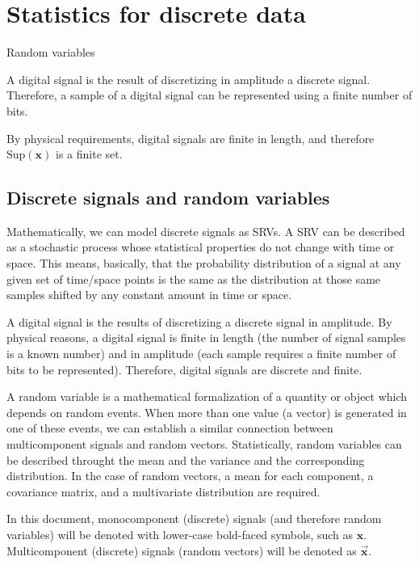 \chapter{Statistics for discrete data}

Random variables

A digital signal is the result of discretizing in amplitude a discrete
signal. Therefore, a sample of a digital signal can be represented
using a finite number of bits.

By physical requirements, digital signals are finite in length, and therefore
$\text{Sup}(\mathbf{x})$ is a finite set.

\section{Discrete signals and random variables}

Mathematically, we can model discrete signals as \glspl{SRV}. A
\gls{SRV} can be described as a stochastic process whose statistical
properties do not change with time or space. This means, basically,
that the probability distribution of a signal at any given set of
time/space points is the same as the distribution at those same
samples shifted by any constant amount in time or space.


A digital signal is the results of discretizing a discrete signal in
amplitude. By physical reasons, a digital signal is finite in length
(the number of signal samples is a known number) and in amplitude
(each sample requires a finite number of bits to be
represented). Therefore, digital signals are discrete and finite.

A random variable is a mathematical formalization of a quantity or
object which depends on random events. When more than one value (a
vector) is generated in one of these events, we can establish a
similar connection between multicomponent signals and random
vectors. Statistically, random variables can be described throught the
mean and the variance and the corresponding distribution. In the case
of random vectors, a mean for each component, a covariance matrix, and
a multivariate distribution are required.

In this document, monocomponent (discrete) signals (and therefore
random variables) will be denoted with lower-case bold-faced symbols,
such as $\mathbf{x}$. Multicomponent (discrete) signals (random
vectors) will be denoted as $\overrightarrow{\mathbf{x}}$.


